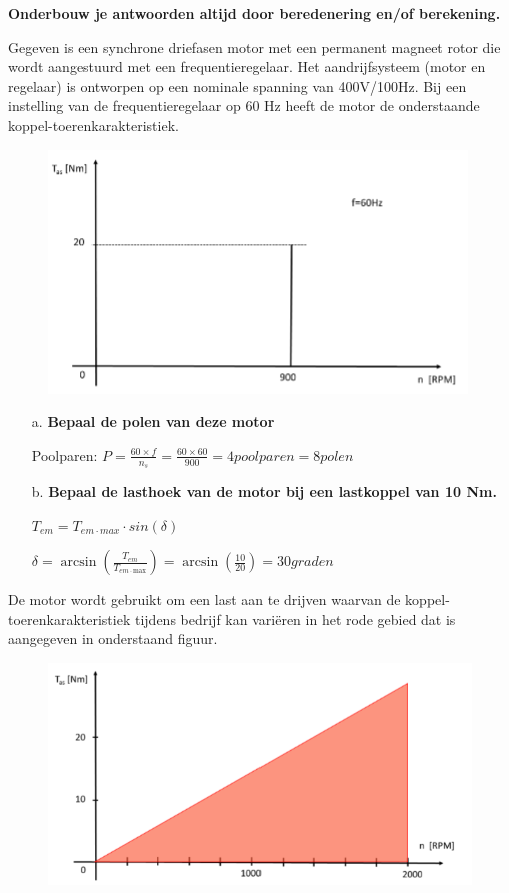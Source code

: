 \textbf{Onderbouw je antwoorden altijd door beredenering en/of berekening.}

Gegeven is een synchrone driefasen motor met een permanent magneet rotor die wordt aangestuurd met een frequentieregelaar. Het aandrijfsysteem (motor en regelaar) is ontworpen op een nominale spanning van 400V/100Hz. Bij een instelling van de frequentieregelaar op 60 Hz heeft de motor de onderstaande
koppel-toerenkarakteristiek.

\begin{figure}[h]
    \centering
    \includegraphics[scale=1]{3-uitleg.png}
\end{figure}

\begin{enumerate}
    \item [a.] \textbf{Bepaal de polen van deze motor}
    
        Poolparen:
        $ P = \frac{60 \times f}{n_{s}} = \frac{60 \times 60}{900} = 4 poolparen = 8 polen$

    \item [b.] \textbf{Bepaal de lasthoek van de motor bij een lastkoppel van 10 Nm.}

        $T_{em} = T_{em \cdot max} \cdot sin(\delta)$

        $\delta 
        = \arcsin \left( \frac{T_{em}}{T_{em \cdot \text{max}}} \right) 
        = \arcsin \left( \frac{10}{20} \right)
        = 30 graden $

\end{enumerate}

De motor wordt gebruikt om een last aan te drijven waarvan de koppel-toerenkarakteristiek tijdens bedrijf kan variëren in het rode gebied dat is aangegeven in onderstaand figuur.
\begin{figure}[h]
    \centering
    \includegraphics[scale=0.8]{3b-uitleg.png}
\end{figure}

